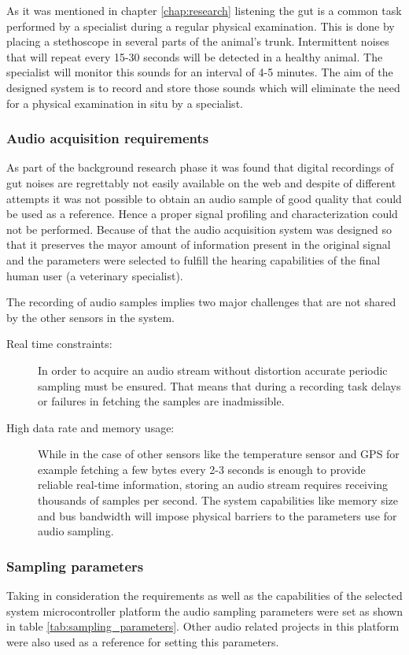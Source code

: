As it was mentioned in chapter \ref{chap:research} listening the gut is a common task performed by a specialist during a regular physical examination. This is done by placing a stethoscope in several parts of the animal's trunk. Intermittent noises that will repeat every 15-30 seconds will be detected in a healthy animal. The specialist will monitor this sounds for an interval of 4-5 minutes. The aim of the designed system is to record and store those sounds which will eliminate the need for a physical examination in situ by a specialist.


\subsubsection{Audio acquisition requirements}
As part of the background research phase it was found that digital recordings of gut noises are regrettably not easily available on the web and despite of different attempts it was not possible to obtain an audio sample of good quality that could be used as a reference. Hence a proper signal profiling and characterization could not be performed. Because of that the audio acquisition system was designed so that it preserves the mayor amount of information present in the original signal and the parameters were selected to fulfill the hearing capabilities of the final human user (a veterinary specialist).

The recording of audio samples implies two major challenges that are not shared by the other sensors in the system.

\begin{description}
\item[Real time constraints:]
In order to acquire an audio stream without distortion accurate periodic sampling must be ensured. That means that during a recording task delays or failures in fetching the samples are inadmissible.

\item[High data rate and memory usage:]
While in the case of other sensors like the temperature sensor and GPS for example fetching a few bytes every 2-3 seconds is enough to provide reliable real-time information, storing an audio stream requires receiving thousands of samples per second. The system capabilities like memory size and bus bandwidth will impose physical barriers to the parameters use for audio sampling.
\end{description}


\subsubsection{Sampling parameters}
Taking in consideration the requirements as well as the capabilities of the selected system microcontroller platform the audio sampling parameters were set as shown in table \ref{tab:sampling_parameters}. Other audio related projects in this platform were also used as a reference for setting this parameters. 

